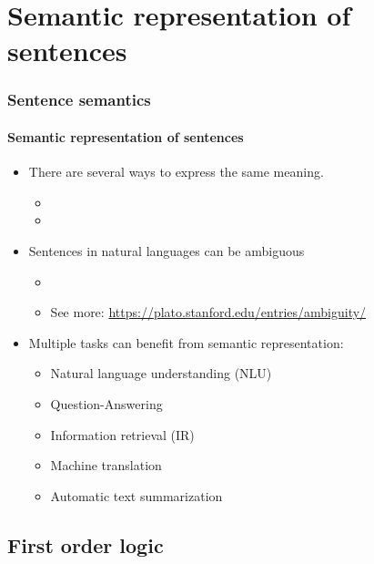 \documentclass[xcolor=table]{beamer}
\begin{document}
\section{Semantic representation of sentences}

\begin{frame}
	\frametitle{Sentence semantics}
	\framesubtitle{Semantic representation of sentences}
	
	\begin{itemize}
		\item There are several ways to express the same meaning.
		\begin{itemize}
			\item {}
			\item {}
		\end{itemize}
	
		\item Sentences in natural languages can be ambiguous
		\begin{itemize}
			\item {}
			\item See more: \url{https://plato.stanford.edu/entries/ambiguity/}
		\end{itemize}
	
		\item Multiple tasks can benefit from semantic representation:
		\begin{itemize}
			\item Natural language understanding (NLU)
			\item Question-Answering
			\item Information retrieval (IR)
			\item Machine translation
			\item Automatic text summarization
		\end{itemize}
	\end{itemize}
	
\end{frame}

\subsection{First order logic}
\end{document}
